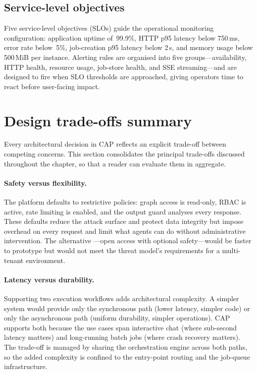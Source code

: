 \documentclass[a4paper,noexaminfo]{sapthesis}
\begin{document}
\subsection{Service-level objectives}

Five service-level objectives (SLOs) guide the operational monitoring
configuration: application uptime of~99.9\%, HTTP p95 latency below
750\,ms, error rate below~5\%, job-creation p95 latency below 2\,s, and
memory usage below 500\,MiB per instance.  Alerting rules are organised
into five groups---availability, HTTP health, resource usage, job-store
health, and SSE streaming---and are designed to fire when SLO thresholds
are approached, giving operators time to react before user-facing impact.


\section{Design trade-offs summary}
\label{sec:design-tradeoffs}

Every architectural decision in CAP reflects an explicit trade-off between
competing concerns.  This section consolidates the principal trade-offs
discussed throughout the chapter, so that a reader can evaluate them in
aggregate.

\paragraph{Safety versus flexibility.}
The platform defaults to restrictive policies: graph access is
read-only, RBAC is active, rate limiting is enabled, and the output guard
analyses every response.  These defaults reduce the attack surface and
protect data integrity but impose overhead on every request and limit
what agents can do without administrative intervention.  The alternative
---open access with optional safety---would be faster to prototype but
would not meet the threat model's requirements for a multi-tenant
environment.

\paragraph{Latency versus durability.}
Supporting two execution workflows adds architectural complexity.  A
simpler system would provide only the synchronous path (lower latency,
simpler code) or only the asynchronous path (uniform durability, simpler
operations).  CAP supports both because the use cases span interactive
chat (where sub-second latency matters) and long-running batch jobs
(where crash recovery matters).  The trade-off is managed by sharing the
orchestration engine across both paths, so the added complexity is
confined to the entry-point routing and the job-queue infrastructure.
\end{document}
